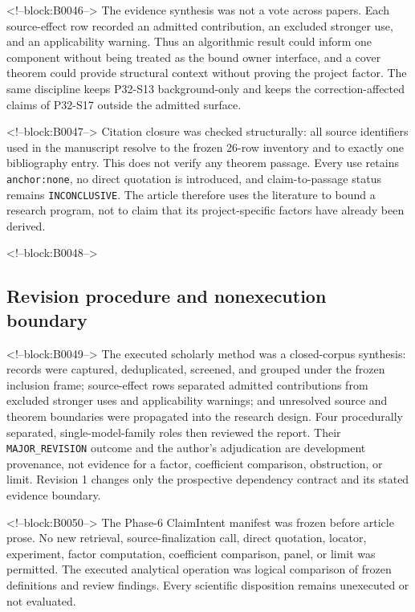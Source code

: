 \documentclass[11pt]{article}
\begin{document}
<!--block:B0046-->
The evidence synthesis was not a vote across papers. Each source-effect
row recorded an admitted contribution, an excluded stronger use, and an
applicability warning. Thus an algorithmic result could inform one
component without being treated as the bound owner interface, and a
cover theorem could provide structural context without proving the
project factor. The same discipline keeps P32-S13 background-only and
keeps the correction-affected claims of P32-S17 outside the admitted
surface.

<!--block:B0047-->
Citation closure was checked structurally: all source identifiers used
in the manuscript resolve to the frozen 26-row inventory and to exactly
one bibliography entry. This does not verify any theorem passage. Every
use retains \texttt{anchor:none}, no direct quotation is introduced,
and claim-to-passage status remains \texttt{INCONCLUSIVE}. The article
therefore uses the literature to bound a research program, not to claim
that its project-specific factors have already been derived.

<!--block:B0048-->
\hypertarget{32-revision-procedure-and-nonexecution-boundary}{%
\subsection{Revision procedure and nonexecution
boundary}\label{32-revision-procedure-and-nonexecution-boundary}}

<!--block:B0049-->
The executed scholarly method was a closed-corpus synthesis: records were
captured, deduplicated, screened, and grouped under the frozen inclusion frame;
source-effect rows separated admitted contributions from excluded stronger uses
and applicability warnings; and unresolved source and theorem boundaries were
propagated into the research design. Four procedurally separated,
single-model-family roles then reviewed the report. Their
\texttt{MAJOR\_REVISION} outcome and the author's adjudication are development
provenance, not evidence for a factor, coefficient comparison, obstruction, or
limit. Revision 1 changes only the prospective dependency contract and its
stated evidence boundary.

<!--block:B0050-->
The Phase-6 ClaimIntent manifest was frozen before article prose. No new
retrieval, source-finalization call, direct quotation, locator,
experiment, factor computation, coefficient comparison, panel, or limit
was permitted. The executed analytical operation was logical comparison
of frozen definitions and review findings. Every scientific disposition
remains unexecuted or not evaluated.
\end{document}
